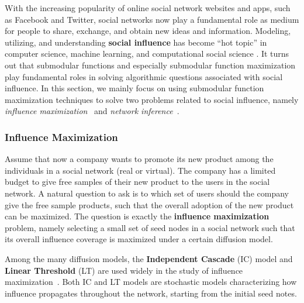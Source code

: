 With the increasing popularity of online social network websites and apps, such as Facebook and Twitter, social networks now play a fundamental role as medium for people to share, exchange, and obtain new ideas and information. Modeling, utilizing, and understanding \textbf{social influence} has become ``hot topic'' in computer science, machine learning, and computational social science \cite{GJA10,KKT03,GB12,Bharathi:2007,Borodin:2010,chen2011influence,he2012influence,Budak:2011}. It turns out that submodular functions and especially submodular function maximization play fundamental roles in solving algorithmic questions associated with social influence. In this section, we mainly focus on using submodular function maximization techniques to solve two problems related to social influence, namely \textit{influence maximization}~\cite{KKT03} and \textit{network inference}~\cite{GJA10}.

\subsubsection{Influence Maximization}
Assume that now a company wants to promote its new product among the individuals in a social network (real or virtual). The company has a limited budget to give free samples of their new product to the users in the social network. A natural question to ask is to which set of users should the company give the free sample products, such that the overall adoption of the new product can be maximized. The question is exactly the \textbf{influence maximization} problem, namely selecting a small set of seed nodes in a social network such that its overall influence coverage is maximized under a certain diffusion model.

Among the many diffusion models, the \textbf{Independent Cascade} (IC) model and \textbf{Linear Threshold} (LT) are used widely in the study of influence maximization~\cite{KKT03}. Both IC and LT models are stochastic models characterizing how influence propagates throughout the network, starting from the initial seed notes.

